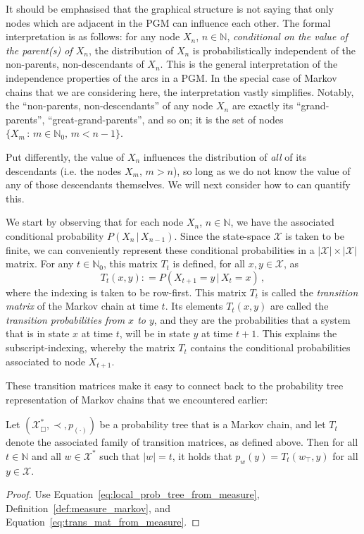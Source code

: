 \documentclass[graybox]{svmult}
\newcommand{\nats}{\mathbb{N}}
\newcommand{\natswith}{\nats_{0}}
\newcommand{\states}{\mathcal{X}}
\newcommand{\coloneqq}{:\!=}
\begin{document}
It should be emphasised that the graphical structure is not saying that only nodes which are adjacent in the PGM can influence each other. The formal interpretation is as follows: for any node $X_n$, $n\in\nats$, \emph{conditional on the value of the parent(s) of $X_n$}, the distribution of $X_n$ is probabilistically independent of the non-parents, non-descendants of $X_n$. This is the general interpretation of the independence properties of the arcs in a PGM. In the special case of Markov chains that we are considering here, the interpretation vastly simplifies. Notably, the ``non-parents, non-descendants'' of any node $X_n$ are exactly its ``grand-parents'', ``great-grand-parents'', and so on; it is the set of nodes $\{X_{m}\,:\,m\in\natswith,\, m<n-1\}$.

Put differently, the value of $X_n$ influences the distribution of \emph{all} of its descendants (i.e. the nodes $X_m$, $m>n$), so long as we do not know the value of any of those descendants themselves. We will next consider how to can quantify this.

We start by observing that for each node $X_n$, $n\in\nats$, we have the associated conditional probability $P(X_n\,\vert\,X_{n-1})$. Since the state-space $\states$ is taken to be finite, we can conveniently represent these conditional probabilities in a $\lvert\states\rvert\times\lvert\states\rvert$ matrix. For any $t\in\natswith$, this matrix $T_t$ is defined, for all $x,y\in\states$, as
\begin{equation}\label{eq:trans_mat_from_measure}
T_t(x,y) \coloneqq P(X_{t+1}=y\,\vert\,X_t=x)\,,
\end{equation}
where the indexing is taken to be row-first. This matrix $T_t$ is called the \emph{transition matrix} of the Markov chain at time $t$. Its elements $T_t(x,y)$ are called the \emph{transition probabilities from $x$ to $y$}, and they are the probabilities that a system that is in state $x$ at time $t$, will be in state $y$ at time $t+1$. This explains the subscript-indexing, whereby the matrix $T_t$ contains the conditional probabilities associated to node $X_{t+1}$.

These transition matrices make it easy to connect back to the probability tree representation of Markov chains that we encountered earlier:
\begin{proposition}
Let $(\states^*_\Box,\prec,p_{(\cdot)})$ be a probability tree that is a Markov chain, and let $T_t$ denote the associated family of transition matrices, as defined above. Then for all $t\in\nats$ and all $w\in\states^*$ such that $\lvert w\rvert = t$, it holds that $p_w(y)=T_t(w_\top, y)$ for all $y\in\states$.
\end{proposition}
\begin{proof}
Use Equation~\eqref{eq:local_prob_tree_from_measure}, Definition~\ref{def:measure_markov}, and Equation~\eqref{eq:trans_mat_from_measure}.
\end{proof}
\end{document}
